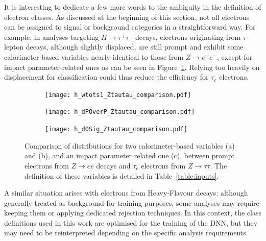It is interesting to dedicate a few more words to the ambiguity in the definition of electron classes. As discussed at the beginning of this section, not all electrons can be assigned to signal or background categories in a straightforward way. For example, in analyses targeting $H \rightarrow \tau^+\tau^-$ decays, electrons originating from $\tau$-lepton decays, although slightly displaced, are still prompt and exhibit some calorimeter-based variables nearly identical to those from $Z \rightarrow e^{+}e^{-}$, except for impact parameter-related ones as can be seen in Figure~\ref{fig:compare}. Relying too heavily on displacement for classification could thus reduce the efficiency for $\tau_e$ electrons. 
\begin{figure}[htbp]
  \centering
  \begin{subfigure}[b]{0.45\textwidth}
      \texttt{[image: h\_wtots1\_Ztautau\_comparison.pdf]}
      \caption{}
  \end{subfigure}
  \hfill
  \begin{subfigure}[b]{0.45\textwidth}
      \texttt{[image: h\_dPOverP\_Ztautau\_comparison.pdf]}
      \caption{}
  \end{subfigure}

  \vspace{0.4cm} %

  \begin{subfigure}[b]{0.6\textwidth}
      \texttt{[image: h\_d0Sig\_Ztautau\_comparison.pdf]}
      \caption{}
  \end{subfigure}

  \caption{Comparison of distributions for two calorimeter-based variables (a) and (b), and an impact parameter related one (c), between prompt electrons from $Z \rightarrow ee$ decays and $\tau_{e}$ electrons from $Z \rightarrow \tau\tau$. The definition of these variables is detailed in Table~\ref{table:inputs}.}
  \label{fig:compare}
\end{figure}


A similar situation arises with electrons from Heavy-Flavour decays: although generally treated as background for training purposes, some analyses may require keeping them or applying dedicated rejection techniques. In this context, the class definitions used in this work are optimised for the training of the DNN, but they may need to be reinterpreted depending on the specific analysis requirements.


